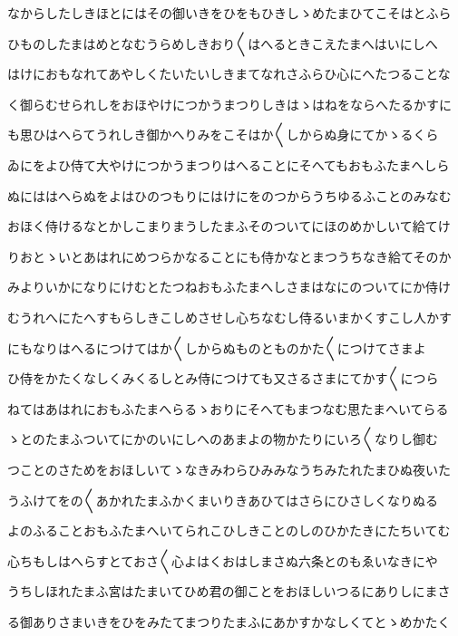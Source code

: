 \documentclass[a4paper,11pt,landscape]{ltjtarticle}
\begin{document}
\par\medskip
なからしたしきほとにはその御いきをひをもひきしゝめたまひてこそはとふら
\par\medskip
ひものしたまはめとなむうらめしきおり〱はへるときこえたまへはいにしへ
\par\medskip
はけにおもなれてあやしくたいたいしきまてなれさふらひ心にへたつることな
\par\medskip
く御らむせられしをおほやけにつかうまつりしきはゝはねをならへたるかすに
\par\medskip
も思ひはへらてうれしき御かへりみをこそはか〱しからぬ身にてかゝるくら
\par\medskip
ゐにをよひ侍て大やけにつかうまつりはへることにそへてもおもふたまへしら
\par\medskip
ぬにははへらぬをよはひのつもりにはけにをのつからうちゆるふことのみなむ
\par\medskip
おほく侍けるなとかしこまりまうしたまふそのついてにほのめかしいて給てけ
\par\medskip
りおとゝいとあはれにめつらかなることにも侍かなとまつうちなき給てそのか
\par\medskip
みよりいかになりにけむとたつねおもふたまへしさまはなにのついてにか侍け
\par\medskip
むうれへにたへすもらしきこしめさせし心ちなむし侍るいまかくすこし人かす
\par\medskip
にもなりはへるにつけてはか〱しからぬものとものかた〱につけてさまよ
\par\medskip
ひ侍をかたくなしくみくるしとみ侍につけても又さるさまにてかす〱につら
\par\medskip
ねてはあはれにおもふたまへらるゝおりにそへてもまつなむ思たまへいてらる
\par\medskip
ゝとのたまふついてにかのいにしへのあまよの物かたりにいろ〱なりし御む
\par\medskip
つことのさためをおほしいてゝなきみわらひみみなうちみたれたまひぬ夜いた
\par\medskip
うふけてをの〱あかれたまふかくまいりきあひてはさらにひさしくなりぬる
\par\medskip
よのふることおもふたまへいてられこひしきことのしのひかたきにたちいてむ
\par\medskip
心ちもしはへらすとておさ〱心よはくおはしまさぬ六条とのもゑいなきにや
\par\medskip
うちしほれたまふ宮はたまいてひめ君の御ことをおほしいつるにありしにまさ
\par\medskip
る御ありさまいきをひをみたてまつりたまふにあかすかなしくてとゝめかたく
\par\medskip
\end{document}
